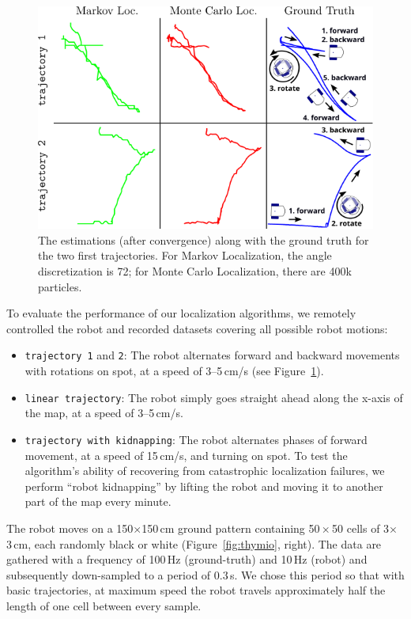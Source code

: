 \documentclass[letterpaper, 10pt, conference]{ieeeconf}
\newcommand{\fig}[1]{Figure~\ref{fig:#1}}
\begin{document}
\begin{figure}
\includegraphics{trajectories}
\caption{The estimations (after convergence) along with the ground truth for the two first trajectories.
For Markov Localization, the angle discretization is 72; for Monte Carlo Localization, there are 400k particles.
}
\label{fig:trajectories}
\end{figure}

To evaluate the performance of our localization algorithms, we remotely controlled the robot and recorded datasets covering all possible robot motions:
\begin{itemize}
\item \texttt{trajectory 1} and \texttt{2}: The robot alternates forward and backward movements with rotations on spot, at a speed of 3--5\,cm/s (see \fig{trajectories}).
\item \texttt{linear trajectory}: The robot simply goes straight ahead along the x-axis of the map, at a speed of 3--5\,cm/s.
\item \texttt{trajectory with kidnapping}: The robot alternates phases of forward movement, at a speed of 15\,cm/s, and turning on spot.
To test the algorithm's ability of recovering from catastrophic localization failures, we perform ``robot kidnapping'' by lifting the robot and moving it to another part of the map every minute.
\end{itemize}
The robot moves on a 150$\times$150\,cm ground pattern containing 50\,$\times$\,50 cells of 3$\times$3\,cm, each randomly black or white (\fig{thymio}, right).
The data are gathered with a frequency of 100\,Hz (ground-truth) and 10\,Hz (robot) and subsequently down-sampled to a period of 0.3\,s.
We chose this period so that with basic trajectories, at maximum speed the robot travels approximately half the length of one cell between every sample.
\end{document}
